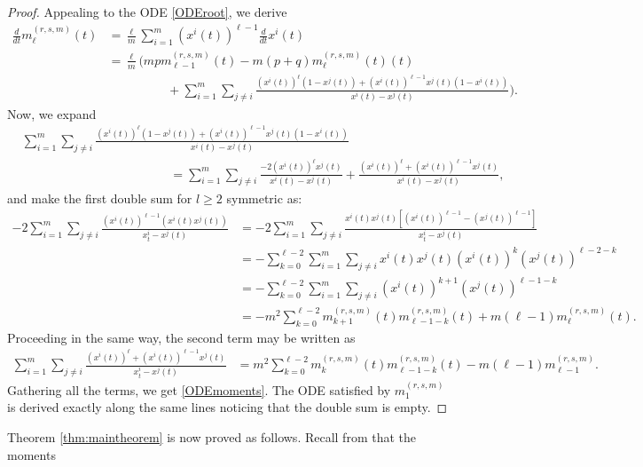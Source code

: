 \documentclass[12pt,reqno]{amsart}
\begin{document}
\begin{proof}
	Appealing to the ODE \eqref{ODEroot}, we derive
    \begin{align*}
		\frac{d}{dt}m_{\ell}^{(r,s,m)}(t) & =\frac{\ell}{m}\sum_{i=1}^m (x^i(t))^{\ell-1}\frac{d}{dt}x^i(t)
		\\&=\frac{\ell}{m}\bigg(mp  m_{\ell-1}^{(r,s,m)}(t)-m(p+q) m_{\ell}^{(r,s,m)}(t)(t)
        \\& \hspace{2cm}+\sum_{i=1}^m\sum_{j\neq i} \frac{(x^i(t))^\ell(1-x^j(t)) + (x^i(t))^{\ell-1}x^j(t)(1 - x^i(t))}{x^i(t) - x^j(t)}\bigg).
	\end{align*}
	Now, we expand
	\begin{align*}
		&\sum_{i=1}^m\sum_{j\neq i} \frac{(x^i(t))^\ell(1-x^j(t)) + (x^i(t))^{\ell-1}x^j(t)(1 - x^i(t))}{x^i(t) - x^j(t)} \\
        &\hspace{5cm}=\sum_{i=1}^m\sum_{j\neq i} \frac{-2(x^i(t))^\ell x^j(t) }{x^i(t) - x^j(t)}+\frac{(x^i(t))^\ell+(x^i(t))^{\ell-1}x^j(t)}{x^i(t)- x^j(t)},
	\end{align*}
	and make the first double sum for $l\ge 2$ symmetric as:
	\begin{align*}
		-2\sum_{i=1}^m\sum_{j\neq i} \frac{(x^i(t))^{\ell-1}(x^i(t)x^j(t)) }{x^i_t - x^j(t)} & =-2\sum_{i=1}^m\sum_{j\neq i} \frac{x^i(t)x^j(t)[(x^i(t))^{\ell-1}-(x^j(t))^{\ell-1}] }{x^i_t - x^j(t)}
		\\&=-\sum_{k=0}^{\ell-2}\sum_{i=1}^m\sum_{j\neq i} x^i(t)x^j(t)(x^i(t))^k(x^j(t))^{\ell-2-k}
		\\&=-\sum_{k=0}^{\ell-2}\sum_{i=1}^m\sum_{j\neq i} (x^i(t))^{k+1}(x^j(t))^{\ell-1-k}
		\\&=-m^2\sum_{k=0}^{\ell-2}m_{k+1}^{(r,s,m)}(t)m_{\ell-1-k}^{(r,s,m)}(t)+m(\ell-1)m_{\ell}^{(r,s,m)}(t).
	\end{align*}
	Proceeding in the same way, the second term may be written as
	\begin{align*}
		\sum_{i=1}^m\sum_{j\neq i}\frac{(x^i(t))^\ell+(x^i(t))^{\ell-1}x^j(t) }{x^i_t - x^j(t)} & =m^2\sum_{k=0}^{\ell-2}m_{k}^{(r,s,m)}(t)m_{\ell-1-k}^{(r,s,m)}(t)-m(\ell-1)m_{\ell-1}^{(r,s,m)}.
	\end{align*}
	Gathering all the terms, we get \eqref{ODEmoments}. The ODE satisfied by $m_1^{(r,s,m)}$ is derived exactly along the same lines noticing that the double sum is empty. 
\end{proof}
Theorem \ref{thm:maintheorem} is now proved as follows. Recall from \cite{MR2384475} that the moments
\end{document}
